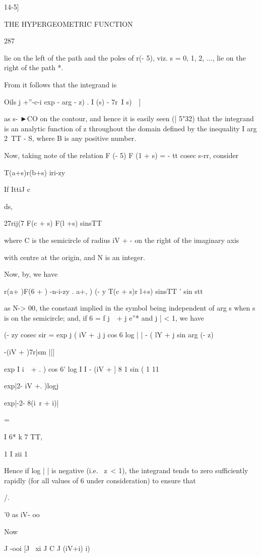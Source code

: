 14-5]

THE HYPERGEOMETRIC FUNCTION

287

lie on the left of the path and the poles of r(- 5), viz. s = 0, 1, 2,
..., lie on the right of the path *.

From it follows that the integrand is

Oils j +''-c-i exp - arg - z) . I (s) - 7r\ I s)\ \ ]

as s- ►CO on the contour, and hence it is easily seen (| 5"32) that
the integrand is an analytic function of z throughout the domain
defined by the inequality I arg 2\ TT - S, where B is any positive
number.

Now, taking note of the relation F (- 5) F (1 + s) = - tt cosec s-rr,
consider

T(a+s)r(b+s) iri-zy

If IttiJ c

ds,

27rij(7 F(c + s) F(l +s) sinsTT

where C is the semicircle of radius iV + - on the right of the
imaginary axis

with centre at the origin, and N is an integer.

Now, by, we have

r(a+ )F(6 + ) -n-i-zy . a+,\,\,) (- y T(c + s)r l+s) sinsTT ' sin
stt

as N-> 00, the constant implied in the symbol being independent of
arg s when s is on the semicircle; and, if 6 = f j\ \ + j e''* and j
| < 1, we have

(- zy cosec sir = exp j ( iV + .j j cos 6 log | | - ( lY + j sin arg
(- z)

-(iV + )7r|sm ||]

exp I i\ \ + . ) cos 6' log I I - (iV + ] 8 1 sin ( 1 11

exp|2- iV +. )logj

exp|-2- 8(i\ r + i)|

=

  I 6* k 7 TT,

1 I zii 1

Hence if log | | is negative (i.e. \ z\ < 1), the integrand tends to
zero sufficiently rapidly (for all values of 6 under consideration) to
ensure that

/.

'0 as iV- oo

Now

J -ooi [J ~xi J C J (iV+i) i)

